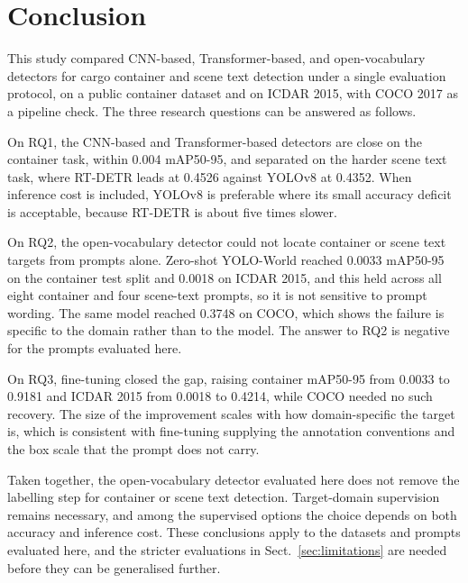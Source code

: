\documentclass[conference]{IEEEtran}
\begin{document}
\section{Conclusion}

This study compared CNN-based, Transformer-based, and open-vocabulary detectors for cargo container and scene text detection under a single evaluation protocol, on a public container dataset and on ICDAR 2015, with COCO 2017 as a pipeline check. The three research questions can be answered as follows.

On RQ1, the CNN-based and Transformer-based detectors are close on the container task, within 0.004 mAP50-95, and separated on the harder scene text task, where RT-DETR leads at 0.4526 against YOLOv8 at 0.4352. When inference cost is included, YOLOv8 is preferable where its small accuracy deficit is acceptable, because RT-DETR is about five times slower.

On RQ2, the open-vocabulary detector could not locate container or scene text targets from prompts alone. Zero-shot YOLO-World reached 0.0033 mAP50-95 on the container test split and 0.0018 on ICDAR 2015, and this held across all eight container and four scene-text prompts, so it is not sensitive to prompt wording. The same model reached 0.3748 on COCO, which shows the failure is specific to the domain rather than to the model. The answer to RQ2 is negative for the prompts evaluated here.

On RQ3, fine-tuning closed the gap, raising container mAP50-95 from 0.0033 to 0.9181 and ICDAR 2015 from 0.0018 to 0.4214, while COCO needed no such recovery. The size of the improvement scales with how domain-specific the target is, which is consistent with fine-tuning supplying the annotation conventions and the box scale that the prompt does not carry.

Taken together, the open-vocabulary detector evaluated here does not remove the labelling step for container or scene text detection. Target-domain supervision remains necessary, and among the supervised options the choice depends on both accuracy and inference cost. These conclusions apply to the datasets and prompts evaluated here, and the stricter evaluations in Sect.~\ref{sec:limitations} are needed before they can be generalised further.
\end{document}
